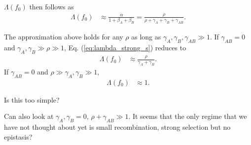 \documentclass[11pt]{article}
\begin{document}
$\Lambda(f_0)$ then follows as
\begin{align}\label{eq:lambda_strong_s}
\Lambda(f_0) &\approx \frac{\alpha}{1+\beta_A + \beta_B} = \frac{\rho}{\rho + \gamma_A + \gamma_B + \gamma_{AB}}.
\end{align}

The approximation above holds for any $\rho$ as long as $\gamma_A, \gamma_B, \gamma_{AB} \gg 1$. If $\gamma_{AB}=0$ and $\gamma_A, \gamma_B \gg \rho \gg 1$, Eq. (\ref{eq:lambda_strong_s}) reduces to
\begin{align}
    \Lambda(f_0) &\approx \frac{\rho}{\gamma_A + \gamma_B}.
\end{align}
If $\gamma_{AB}=0$ and $\rho \gg \gamma_A, \gamma_B \gg 1$, 
\begin{align}
    \Lambda(f_0) &\approx 1.
\end{align}

Is this too simple?

Can also look at $\gamma_A, \gamma_B = 0$, $\rho + \gamma_{AB} \gg 1$. It seems that the only regime that we have not thought about yet is small recombination, strong selection but no epistasis? 
\end{document}
